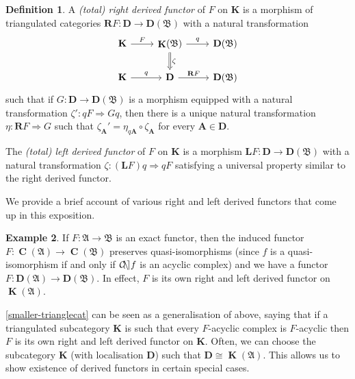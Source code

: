 \documentclass[a4paper]{article}
\theoremstyle{definition}
\newtheorem{defn}{Definition}[section]
\newtheorem{example}[defn]{Example}
\theoremstyle{remark}
\DeclareMathOperator{\cone}{\mathcal{C\kern -2pt o \kern -2pt n \kern -2pt e
\kern -2pt}}
\DeclareMathOperator{\Ch}{\mathbf{C}}
\DeclareMathOperator{\kom}{{\mathbf{K}}}
\newcommand{\deri}{\mathbf{D}}
\begin{document}
\begin{defn}
    A \textit{(total) right derived functor} of \(F\) on \(\mathbf{K}\) is a
    morphism of triangulated categories \({\mathbf{R}F: \mathbf{D}\rightarrow
    \mathbf{D}(\mathfrak{B})}\) with a natural transformation 
    \[\begin{tikzcd}
        \mathbf{K}\arrow[r,"F"] 
        &\kom(\mathfrak{B}) \arrow[r,"q"] \arrow[d, Rightarrow, "\zeta"]
        & \deri(\mathfrak{B}) \\ 
        \mathbf{K} \arrow[r,"q"] 
        &\mathbf{D} \arrow[r, "\mathbf{R}F"]
        &\deri(\mathfrak{B})
    \end{tikzcd}\]
    such that if \(G:\mathbf{D}\rightarrow \deri(\mathfrak{B})\) is
    a morphism equipped with a natural transformation \(\zeta':
    qF\Rightarrow Gq \), then there is a unique natural transformation \(\eta:
    \mathbf{R}F\Rightarrow G\) such that \(\zeta_\mathbf{A}' = \eta_{q
    \mathbf{A}} \circ \zeta_\mathbf{A}\) for every \(\mathbf{A}\in \deri\).

    The \textit{(total) left derived functor} of \(F\) on \(\mathbf{K}\) is a
    morphism \(\mathbf{L}F: \mathbf{D}\rightarrow \deri(\mathfrak{B})\) with a
    natural transformation \(\zeta: (\mathbf{L}F)q\Rightarrow qF\) satisfying a
    universal property similar to the right derived functor.
\end{defn}

We provide a brief account of various right and left derived functors that come
up in this exposition.

\begin{example}\label{exactfunctor-derived}
    If \(F:\mathfrak{A}\rightarrow \mathfrak{B}\) is an exact functor, then the
    induced functor \(F:\Ch(\mathfrak{A})\rightarrow \Ch(\mathfrak{B})\)
    preserves quasi-isomorphisms (since \(f\) is a quasi-isomorphism if and only
    if \(\cone f\) is an acyclic complex) and we have a functor
    \(F:\deri(\mathfrak{A})\rightarrow \deri(\mathfrak{B})\). In effect,
    \(F\) is its own right and left derived functor on \(\kom(\mathfrak{A})\).
\end{example}

\cref{smaller-trianglecat} can be seen as a generalisation of above, saying that
if a triangulated subcategory \(\mathbf{K}\) is such that every \(F\)-acyclic
complex is \(F\)-acyclic then \(F\) is its own right and left derived
functor on \(\mathbf{K}\). Often, we can choose the subcategory \(\mathbf{K}\) (with
localisation \(\mathbf{D}\)) such that \(\mathbf{D}\cong \kom(\mathfrak{A})\).
This allows us to show existence of derived functors in certain special cases.
\end{document}

